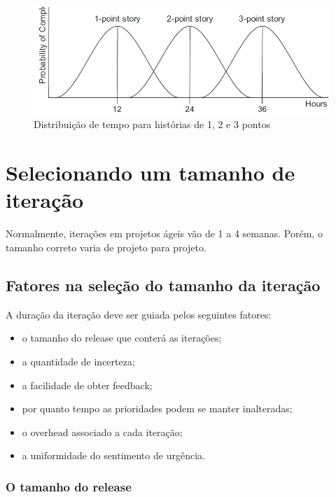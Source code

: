 \documentclass[a4paper,abntfigtabnum,noindentfirst]{abnt}
\begin{document}
\begin{figure}
  \caption{Distribuição de tempo para histórias de 1, 2 e 3 pontos}
  \label{distribuicao-de-tempo-para-historias-de-1-2-e-3-pontos}
  \begin{center}
  \includegraphics[scale=0.6]{distribuicao-de-tempo-para-historias-de-1-2-e-3-pontos}
  \end{center}
\end{figure}


\chapter{Selecionando um tamanho de iteração}
\label{selecionando-um-tamanho-de-iteracao}

Normalmente, iterações em projetos ágeis vão de 1 a 4 semanas. Porém, o tamanho correto varia de projeto para projeto.

\section{Fatores na seleção do tamanho da iteração}

A duração da iteração deve ser guiada pelos seguintes fatores:
\begin{itemize}
 \item o tamanho do release que conterá as iterações;
 \item a quantidade de incerteza;
 \item a facilidade de obter feedback;
 \item por quanto tempo as prioridades podem se manter inalteradas;
 \item o overhead associado a cada iteração;
 \item a uniformidade do sentimento de urgência.
\end{itemize}

\subsection{O tamanho do release}
\end{document}
